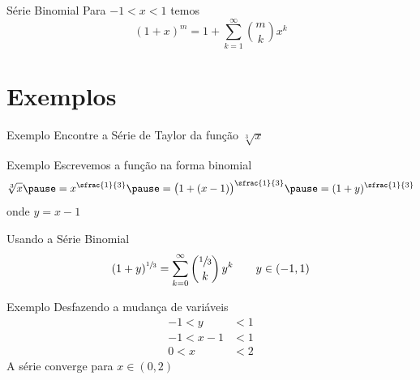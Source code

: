 \begin{frame}{Série Binomial}
Para \(-1<x<1\) temos
\[ (1+x)^m = 1 + \sum_{k=1}^{\infty} \binom{m}{k} x^k \]
\end{frame}

\section{Exemplos}

\addtocounter{exemplo}{1}
\begin{frame}{Exemplo \theexemplo}
  Encontre a Série de Taylor da função $\sqrt[3]{x}$
\end{frame}

\begin{frame}{Exemplo \theexemplo}
  Escrevemos a função na forma binomial
  \[
    \sqrt[3]{x}
    \pause
    = x^{\sfrac{1}{3}}
    \pause
    = \big(1 + (x-1)\big)^{\sfrac{1}{3}}
    \pause
    = (1+y)^{\sfrac{1}{3}}
  \]
  onde $y=x-1$

  \pause
  \vspace{\baselineskip}
  Usando a Série Binomial
  \[
    (1+y)^{\sfrac{1}{3}} = \sum_{k=0}^\infty \binom{\sfrac{1}{3}}{k}\, y^k
    \qquad y \in(-1, 1)
  \]
\end{frame}

\begin{frame}{Exemplo \theexemplo}
    Desfazendo a mudança de variáveis
    \begin{align*}
        -1 < y & < 1 \\
        -1 < x-1 & < 1 \\
        0 < x & < 2 
    \end{align*}
    A série converge para $x \in(0, 2)$
\end{frame}


